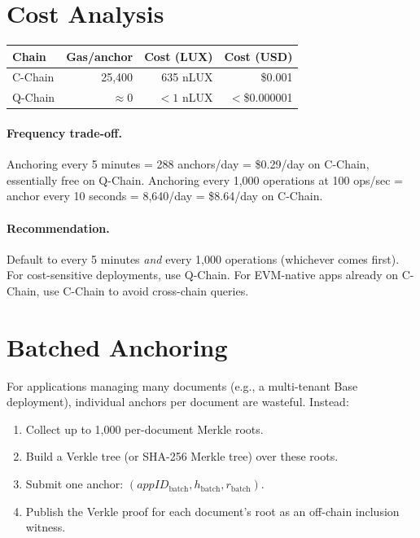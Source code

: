 \documentclass[11pt,a4paper]{article}
\begin{document}
\section{Cost Analysis}
\label{sec:cost}

\begin{center}
\begin{tabular}{lrrr}
\toprule
\textbf{Chain} & \textbf{Gas/anchor} & \textbf{Cost (LUX)} & \textbf{Cost (USD)} \\
\midrule
C-Chain & 25,400 & 635 nLUX & \$0.001 \\
Q-Chain & $\approx 0$ & $<1$ nLUX & $<$\$0.000001 \\
\bottomrule
\end{tabular}
\end{center}

\paragraph{Frequency trade-off.}
Anchoring every 5 minutes = 288 anchors/day = \$0.29/day on C-Chain,
essentially free on Q-Chain. Anchoring every 1,000 operations at 100
ops/sec = anchor every 10 seconds = 8,640/day = \$8.64/day on C-Chain.

\paragraph{Recommendation.}
Default to every 5 minutes \emph{and} every 1,000 operations (whichever
comes first). For cost-sensitive deployments, use Q-Chain. For EVM-native
apps already on C-Chain, use C-Chain to avoid cross-chain queries.

\section{Batched Anchoring}
\label{sec:batching}

For applications managing many documents (e.g., a multi-tenant Base
deployment), individual anchors per document are wasteful. Instead:

\begin{enumerate}[nosep]
  \item Collect up to 1,000 per-document Merkle roots.
  \item Build a Verkle tree (or SHA-256 Merkle tree) over these roots.
  \item Submit one anchor: $(appID_{\text{batch}}, h_{\text{batch}}, r_{\text{batch}})$.
  \item Publish the Verkle proof for each document's root as an off-chain
        inclusion witness.
\end{enumerate}
\end{document}
